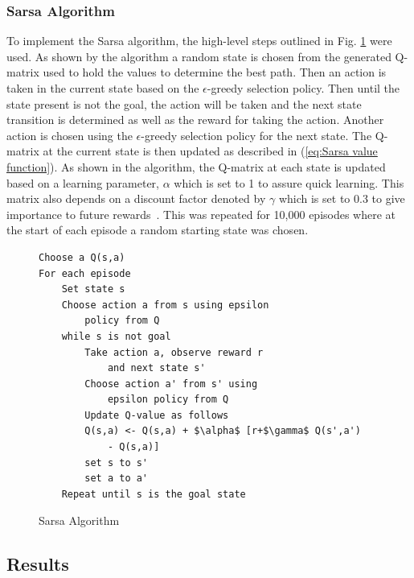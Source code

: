 \documentclass[12pt,american]{report}
\begin{document}
\subsubsection{Sarsa Algorithm}
To implement the Sarsa algorithm, the high-level steps outlined in Fig. \ref{fig:sarsa} were used.  As shown by the algorithm a random state is chosen from the generated Q-matrix used to hold the values to determine the best path.  Then an action is taken in the current state based on the \begin{math}\epsilon\end{math}-greedy selection policy.  Then until the state present is not the goal, the action will be taken and the next state transition is determined as well as the reward for taking the action. Another action is chosen using the \begin{math}\epsilon\end{math}-greedy selection policy for the next state. The Q-matrix at the current state is then updated as described in (\ref{eq:Sarsa value function}). As shown in the algorithm, the Q-matrix at each state is updated based on a learning parameter, \begin{math}\alpha\end{math} which is set to 1 to assure quick learning. This matrix also depends on a discount factor denoted by \begin{math}\gamma\end{math} which is set to 0.3 to give importance to future rewards~\cite{Eden}. This was repeated for 10,000 episodes where at the start of each episode a random starting state was chosen.


\begin{figure}
\centering
\begin{lstlisting}[frame=single]
Choose a Q(s,a)
For each episode
    Set state s
    Choose action a from s using epsilon 
        policy from Q
    while s is not goal
        Take action a, observe reward r 
            and next state s'
        Choose action a' from s' using 
            epsilon policy from Q
        Update Q-value as follows
        Q(s,a) <- Q(s,a) + $\alpha$ [r+$\gamma$ Q(s',a') 
            - Q(s,a)]
        set s to s'
        set a to a'
    Repeat until s is the goal state
\end{lstlisting}
\caption{Sarsa Algorithm~\cite{Eden}}
\label{fig:sarsa}
\end{figure}

\subsection{Results}
\end{document}
